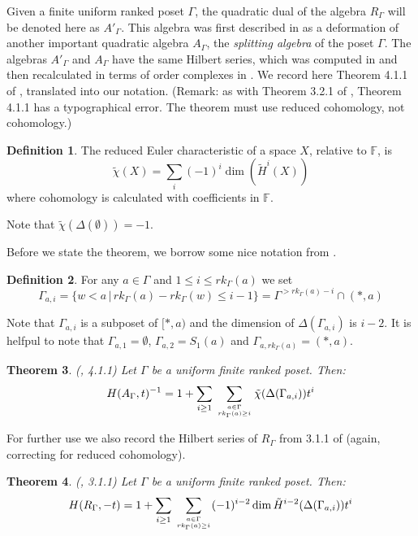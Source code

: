 \documentclass[11pt,righttag]{amsart}
\newtheorem{thm}{Theorem}[section]
\theoremstyle{definition}
\newtheorem{defn}[thm]{Definition}
\begin{document}
Given a finite uniform ranked poset $\Gamma$, the quadratic dual of the algebra $R_\Gamma$ will be denoted here as 
$A'_\Gamma$.  This algebra was first described in \cite{GRSW} as a deformation of another important quadratic algebra
 $A_\Gamma$, the  {\it splitting algebra} of the poset $\Gamma$.  The algebras $A'_\Gamma$ and $A_\Gamma$ have the 
 same Hilbert series, which was computed in \cite{RSW1} and then recalculated in terms of order complexes in \cite{RSW4}.   We 
 record here Theorem 4.1.1 of \cite{RSW4}, translated into our notation.  (Remark: as with Theorem 3.2.1 of \cite{RSW4}, 
 Theorem 4.1.1 has a typographical error.  The theorem must use reduced cohomology, not cohomology.)

\begin{defn}  The reduced Euler characteristic of a space $X$, relative to ${{\mathbb F}}$, is 
$$\tilde \chi (X) = \sum_i (-1)^i \dim(\tilde H^i(X))$$
where cohomology is calculated with coefficients in ${{\mathbb F}}$. 
\end{defn}

Note that $\tilde\chi (\Delta(\emptyset)) = -1$.

Before we state the theorem, we  borrow some nice notation from \cite{RSW4}.

\begin{defn} For any $a\in \Gamma$ and $1\le i\le rk_\Gamma(a)$ we set 
$$\Gamma_{a,i} = \{ w<a \,|\, rk_\Gamma(a)-rk_\Gamma(w) \le i-1\} = \Gamma^{>rk_\Gamma(a)-i} \cap (*,a)$$
\end{defn}

Note that $\Gamma_{a,i}$ is a subposet of $[*,a)$ and the dimension of $\Delta(\Gamma_{a,i})$ is 
$i-2$.  It is helfpul to note that $\Gamma_{a,1} = \emptyset$, $\Gamma_{a,2} = S_1(a)$ and $\Gamma_{a,rk_\Gamma(a)} = (*,a)$.   

\begin{thm}\label{HS1} {\rm (\cite{RSW4}, 4.1.1)} Let $\Gamma$ be a uniform finite ranked poset.  Then:
$$  H(A_\Gamma, t)^{-1} = 1 + \sum_{i\ge 1}\, \sum_{a\in \Gamma \atop rk_\Gamma(a) \ge i} \tilde\chi(\Delta(\Gamma_{a,i})) t^i $$
\end{thm}

For further use we also record the Hilbert series of $R_\Gamma$ from 3.1.1 of \cite{RSW4} (again, correcting for reduced cohomology).

\begin{thm}\label{HS2} {\rm (\cite{RSW4}, 3.1.1)} Let $\Gamma$ be a uniform finite ranked poset.  Then:
$$  H(R_\Gamma, -t) = 1 + \sum_{i\ge 1}\, \sum_{a\in \Gamma \atop rk_\Gamma(a) \ge i} (-1)^{i-2}\dim\tilde H^{i-2}(\Delta(\Gamma_{a,i})) t^i $$
\end{thm}
\end{document}
